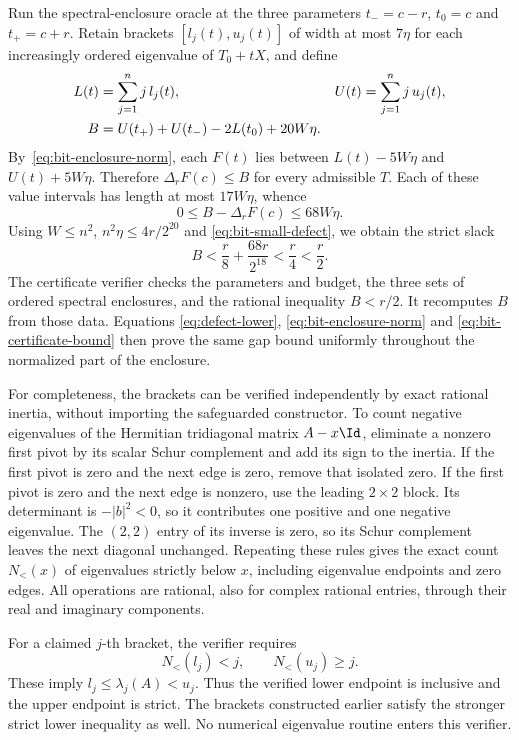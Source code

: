 Run the spectral-enclosure oracle at the three parameters
$t_-=c-r$, $t_0=c$ and $t_+=c+r$. Retain brackets
$[l_j(t),u_j(t)]$ of width at most $7\eta$ for each increasingly
ordered eigenvalue of $T_0+tX$, and define
\begin{align}
 L(t)&=\sum_{j=1}^n j\,l_j(t),&
 U(t)&=\sum_{j=1}^n j\,u_j(t),\notag\\
 B&=U(t_+)+U(t_-)-2L(t_0)+20W\eta.
 \label{eq:bit-certificate-bound}
\end{align}
By~\eqref{eq:bit-enclosure-norm}, each $F(t)$ lies between
$L(t)-5W\eta$ and $U(t)+5W\eta$. Therefore
$\Delta_rF(c)\leq B$ for every admissible $T$. Each of these
value intervals has length at most $17W\eta$, whence
\[
 0\leq B-\Delta_rF(c)\leq68W\eta.
\]
Using $W\leq n^2$, $n^2\eta\leq4r/2^{20}$ and
\eqref{eq:bit-small-defect}, we obtain the strict slack
\begin{equation}\label{eq:bit-certificate-slack}
 B<\frac r8+\frac{68r}{2^{18}}<\frac r4<\frac r2.
\end{equation}
The certificate verifier checks the parameters and budget, the three
sets of ordered spectral enclosures, and the rational inequality
$B<r/2$. It recomputes $B$ from those data. Equations
\eqref{eq:defect-lower}, \eqref{eq:bit-enclosure-norm} and
\eqref{eq:bit-certificate-bound} then prove the same gap bound
uniformly throughout the normalized part of the enclosure.

For completeness, the brackets can be verified independently by
exact rational inertia, without importing the safeguarded constructor.
To count negative eigenvalues of the Hermitian tridiagonal matrix
$A-x\Id$, eliminate a nonzero first pivot by its scalar Schur
complement and add its sign to the inertia. If the first pivot is
zero and the next edge is zero, remove that isolated zero. If the
first pivot is zero and the next edge is nonzero, use the leading
$2\times2$ block. Its determinant is $-|b|^2<0$, so it contributes
one positive and one negative eigenvalue. The $(2,2)$ entry of its
inverse is zero, so its Schur complement leaves the next diagonal
unchanged. Repeating these rules gives the exact count $N_<(x)$ of
eigenvalues strictly below $x$, including eigenvalue endpoints and
zero edges. All operations are rational, also for complex rational
entries, through their real and imaginary components.

For a claimed $j$-th bracket, the verifier requires
\begin{equation}\label{eq:bit-verifier-brackets}
 N_<(l_j)<j,\qquad N_<(u_j)\geq j.
\end{equation}
These imply $l_j\leq\lambda_j(A)<u_j$. Thus the verified lower
endpoint is inclusive and the upper endpoint is strict. The brackets
constructed earlier satisfy the stronger strict lower inequality as
well. No numerical eigenvalue routine enters this verifier.

